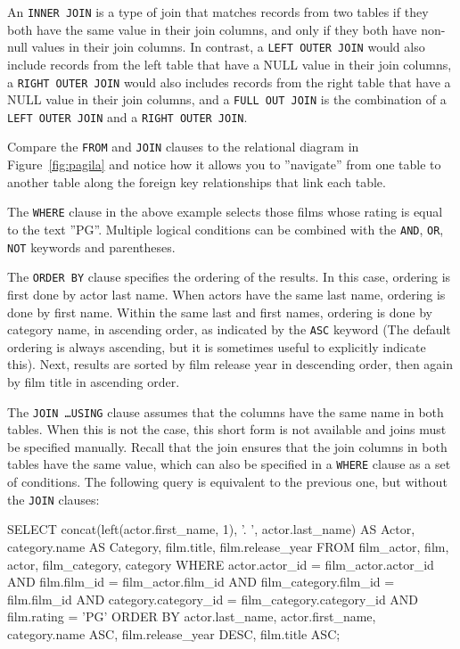 An \texttt{INNER JOIN} is a type of join that matches records from two tables if they both have the same value in their join columns, and only if they both have non-null values in their join columns. In contrast, a \texttt{LEFT OUTER JOIN} would also include records from the left table that have a NULL value in their join columns, a \texttt{RIGHT OUTER JOIN} would also includes records from the right table that have a NULL value in their join columns, and a \texttt{FULL OUT JOIN} is the combination of a \texttt{LEFT OUTER JOIN} and a \texttt{RIGHT OUTER JOIN}.

Compare the \texttt{FROM} and \texttt{JOIN} clauses to the relational diagram in Figure~\ref{fig:pagila} and notice how it allows you to ''navigate'' from one table to another table along the foreign key relationships that link each table.

The \texttt{WHERE} clause in the above example selects those films whose rating is equal to the text ''PG''. Multiple logical conditions can be combined with the \texttt{AND}, \texttt{OR}, \texttt{NOT} keywords and parentheses.

The \texttt{ORDER BY} clause specifies the ordering of the results. In this case, ordering is first done by actor last name. When actors have the same last name, ordering is done by first name. Within the same last and first names, ordering is done by category name, in ascending order, as indicated by the \texttt{ASC} keyword (The default ordering is always ascending, but it is sometimes useful to explicitly indicate this). Next, results are sorted by film release year in descending order, then again by film title in ascending order.

The \texttt{JOIN \ldots USING} clause assumes that the columns have the same name in both tables. When this is not the case, this short form is not available and joins must be specified manually. Recall that the join ensures that the join columns in both tables have the same value, which can also be specified in a \texttt{WHERE} clause as a set of conditions. The following query is equivalent to the previous one, but without the \texttt{JOIN} clauses:

\begin{sqlcode}
SELECT concat(left(actor.first_name, 1), '. ', 
           actor.last_name) AS Actor, 
       category.name AS Category, 
       film.title, 
       film.release_year
  FROM film_actor, film, actor, film_category, category
  WHERE actor.actor_id = film_actor.actor_id AND
        film.film_id = film_actor.film_id AND
        film_category.film_id = film.film_id AND
        category.category_id = film_category.category_id AND
        film.rating = 'PG'
  ORDER BY actor.last_name, 
           actor.first_name, 
           category.name ASC, 
           film.release_year DESC, 
           film.title ASC;
\end{sqlcode}

